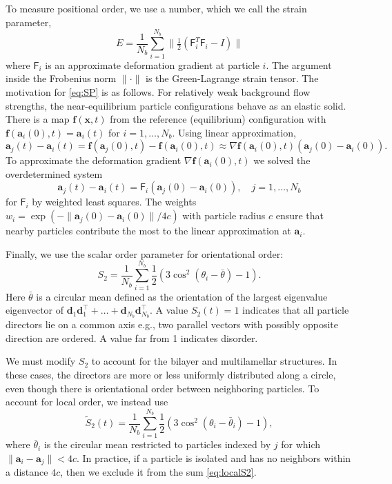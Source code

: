 \documentclass[prb,preprint,showpacs,preprintnumbers,amsmath,amssymb,longbibliography]{revtex4-1}
\renewcommand{\aa}{\mathbf{a}}
\newcommand{\dd}{\mathbf{d}}
\newcommand{\ff}{\mathbf{f}}
\newcommand{\xx}{\mathbf{x}}
\begin{document}
To measure positional order, we use a number,
which we call the strain parameter, 
\begin{equation}
\label{eq:SP}
E = \frac{1}{N_b} \sum_{i=1}^{N_b}
\|\tfrac{1}{2}(\mathsf{F}_i^T \mathsf{F}_i - I)\|
\end{equation}
where $\mathsf{F}_i$ is an 
approximate deformation gradient at particle $i$.
The argument inside the Frobenius norm $\| \cdot \|$
is the Green-Lagrange strain tensor.
The motivation for  \eqref{eq:SP} is as follows.
For relatively weak background flow strengths, the near-equilibrium particle
configurations behave as an elastic solid.  There is a map $\ff(\xx,t)$
from the reference (equilibrium) configuration with $\ff(\aa_i(0),t) = \aa_i(t)$
for $i = 1,\dots,N_b$.  Using linear approximation,
\[
\aa_j(t) - \aa_i(t) = \ff(\aa_j(0),t) - \ff(\aa_i(0),t)
\approx \nabla \ff(\aa_i(0),t)(\aa_j(0) - \aa_i(0)).
\]
To approximate
the deformation gradient $\nabla \ff(\aa_i(0),t)$
we solved the overdetermined system 
\[
\aa_j(t) - \aa_i(t) = \mathsf{F}_i(\aa_j(0) - \aa_i(0)),\quad j = 1,\dots, N_b  
\]
for $\mathsf{F}_i$ by weighted least squares. The weights  
$w_i = \exp(-\|\aa_j(0) - \aa_i(0)\|/4c)$ with particle radius $c$
ensure that nearby particles contribute the most to the linear approximation at $\aa_i$. 

Finally, we use the scalar order parameter for orientational order:
\begin{equation}
  \label{eq:S2}
S_2 = \frac{1}{N_b} \sum_{i=1}^{N_b} \frac{1}{2}(3\cos^2(\theta_i - \bar \theta) - 1).
\end{equation}
Here $\bar \theta$ is a circular mean defined as the
orientation of the largest eigenvalue eigenvector of 
$\dd_1\dd_1^\top + \dots + \dd_{N_b}\dd_{N_b}^\top$.
A value $S_2(t) = 1$ indicates 
that all particle directors lie on a common axis e.g.,
two parallel vectors with possibly opposite direction are ordered. 
A value far from 1 indicates disorder.

We must modify $S_2$ to account for the bilayer and
multilamellar structures.  In these cases, the directors 
are more or less uniformly distributed along a circle, even though
there is orientational order between neighboring particles.
To account for local order, we instead use
\begin{equation}
  \label{eq:localS2}
\tilde{S}_2(t) = \frac{1}{N_b} \sum_{i=1}^{N_b}
\frac{1}{2}(3\cos^2(\theta_i - \bar \theta_i) - 1),
\end{equation}
where $\bar \theta_i$ is the circular mean restricted to particles
indexed by $j$ for which $\|\aa_i - \aa_j\| < 4c$. In practice, if a particle is
isolated and has no neighbors within a distance $4c$, then we exclude it from
the sum \eqref{eq:localS2}. 
\end{document}
